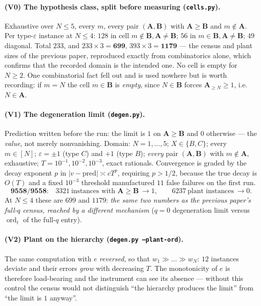 \documentclass[11pt]{article}
\theoremstyle{plain}
\theoremstyle{definition}
\newcommand{\bA}{\mathbf{A}}
\newcommand{\bB}{\mathbf{B}}
\newcommand{\ord}{\operatorname{ord}}
\begin{document}
\paragraph{(V0) The hypothesis class, split before measuring
(\texttt{cells.py}).}  Exhaustive over $N\le5$, every $m$, every pair
$(\bA,\bB)$ with $\bA\ge\bB$ and $m\notin\bA$.  Per type-$\varepsilon$ instance at
$N\le4$: $128$ in cell $m\notin\bB,\bA\ne\bB$; $56$ in $m\in\bB,\bA\ne\bB$; $49$
diagonal.  Total $233$, and $233\times3=\mathbf{699}$, $393\times3=\mathbf{1179}$
--- the census and plant sizes of the previous paper, reproduced exactly from
combinatorics alone, which confirms that the recorded domain is the intended one.
No cell is empty for $N\ge2$.  One combinatorial fact fell out and is used
nowhere but is worth recording: if $m=N$ the cell $m\in\bB$ is \emph{empty}, since
$N\in\bB$ forces $\bA_{\ge N}\ge1$, i.e.\ $N\in\bA$.

\paragraph{(V1) The degeneration limit (\texttt{degen.py}).}
Prediction written before the run: the limit is $1$ on $\bA\ge\bB$ and $0$
otherwise --- the \emph{value}, not merely nonvanishing.
Domain: $N=1,\dots,5$; $X\in\{B,C\}$; every $m\in[N]$; $\varepsilon=\pm1$ (type
$C$) and $+1$ (type $B$); \emph{every} pair $(\bA,\bB)$ with $m\notin\bA$,
exhaustive; $T=10^{-1},10^{-2},10^{-3}$, exact rationals.  Convergence is graded
by the decay exponent $p$ in $|v-\text{pred}|\asymp cT^{p}$, requiring $p>1/2$,
because the true decay is $O(T)$ and a fixed $10^{-3}$ threshold manufactured $11$
false failures on the first run.
\[
  \textbf{9558/9558:}\quad
  3321\ \text{instances with }\bA\ge\bB\ \to1,\qquad
  6237\ \text{plant instances}\ \to0 .
\]
At $N\le4$ these are $699$ and $1179$: \emph{the same two numbers as the previous
paper's full-$q$ census, reached by a different mechanism} ($q=0$ degeneration
limit versus $\ord_t$ of the full-$q$ entry).

\paragraph{(V2) Plant on the hierarchy (\texttt{degen.py --plant-ord}).}
The same computation with $e$ \emph{reversed}, so that
$w_1\gg\dots\gg w_N$: $12$ instances deviate and their errors \emph{grow} with
decreasing $T$.  The monotonicity of $e$ is therefore load-bearing and the
instrument can see its absence --- without this control the census would not
distinguish ``the hierarchy produces the limit'' from ``the limit is $1$ anyway''.
\end{document}
